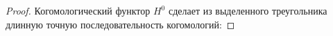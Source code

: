 \documentclass[../main.tex]{subfiles}
\begin{document}
\begin{proof}
\bee
{}
\eee
 Когомологический функтор $H^0$ сделает из выделенного треугольника длинную точную последовательность когомологий:
 \bee
{}
\eee
\end{proof}
\end{document}
